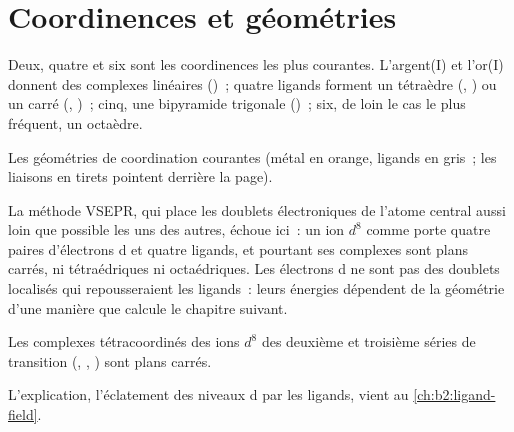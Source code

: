 \section{Coordinences et géométries}

Deux, quatre et six sont les coordinences les plus courantes. L'argent(I) et l'or(I) donnent
des complexes linéaires (\ce{[Ag(NH3)2]+})~; quatre ligands forment un tétraèdre
(, ) ou un carré (, )~;
cinq, une bipyramide trigonale ()~; six, de loin le cas le plus fréquent, un
octaèdre.

\begin{omfigure}

{\small Les géométries de coordination courantes (métal en orange, ligands en gris~; les liaisons
en tirets pointent derrière la page).}
\end{omfigure}

La méthode VSEPR, qui place les doublets électroniques de l'atome central aussi loin que possible les uns des autres,
échoue ici~: un ion $d^8$ comme  porte quatre paires d'électrons d et quatre
ligands, et pourtant ses complexes sont plans carrés, ni tétraédriques ni octaédriques. Les
électrons d ne sont pas des doublets localisés qui repousseraient les ligands~: leurs énergies dépendent
de la géométrie d'une manière que calcule le chapitre suivant.

\begin{proposition}\label{prop:b2:coordination-complexes:square-planar}
Les complexes tétracoordinés des ions $d^8$ des deuxième et troisième séries de transition
(, , ) sont plans carrés.
\end{proposition}

\admitted

L'explication, l'éclatement des niveaux d par les ligands, vient au
\cref{ch:b2:ligand-field}.

